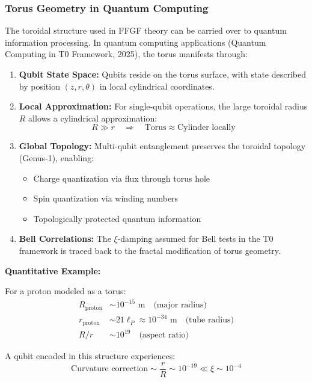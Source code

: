 \subsubsection{Torus Geometry in Quantum Computing}

The toroidal structure used in FFGF theory can be carried over to
quantum information processing. In quantum computing applications
(Quantum Computing in T0 Framework, 2025), the torus manifests through:

\begin{enumerate}
	\item \textbf{Qubit State Space:} Qubits reside on the torus surface, 
	with state described by position $(z, r, \theta)$ in local 
	cylindrical coordinates.
	
	\item \textbf{Local Approximation:} For single-qubit operations, the 
	large toroidal radius $R$ allows a cylindrical approximation:
	\[
	R \gg r \quad \Rightarrow \quad 
	\text{Torus} \approx \text{Cylinder locally}
	\]
	
	\item \textbf{Global Topology:} Multi-qubit entanglement preserves the 
	toroidal topology (Genus-1), enabling:
	\begin{itemize}
		\item Charge quantization via flux through torus hole
		\item Spin quantization via winding numbers
		\item Topologically protected quantum information
	\end{itemize}
	
	\item \textbf{Bell Correlations:} The $\xi$-damping assumed for Bell
	tests in the T0 framework is traced back to the fractal modification of torus geometry.
\end{enumerate}

\textbf{Quantitative Example:}

For a proton modeled as a torus:
\begin{align}
	R_{\text{proton}} &\sim 10^{-15} \text{ m} \quad \text{(major radius)} \\
	r_{\text{proton}} &\sim 21\ell_P \approx 10^{-34} \text{ m} \quad 
	\text{(tube radius)} \\
	R/r &\sim 10^{19} \quad \text{(aspect ratio)}
\end{align}

A qubit encoded in this structure experiences:
\[
\text{Curvature correction} \sim \frac{r}{R} \sim 10^{-19} 
\ll \xi \sim 10^{-4}
\]

